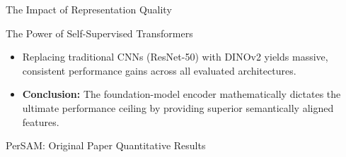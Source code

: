 \documentclass[aspectratio=169, 10pt]{beamer}
\begin{document}
\begin{frame}{The Impact of Representation Quality}
    \begin{table}[htbp]
    \centering
    \caption{Impact of Backbone Choice on COCO-$20^i$ (1-Shot mIoU \%)}
    \end{table}

    \begin{exampleblock}{The Power of Self-Supervised Transformers}
        \begin{itemize}
            \item Replacing traditional CNNs (ResNet-50) with DINOv2 yields massive, consistent performance gains across all evaluated architectures.
            \item \textbf{Conclusion:} The foundation-model encoder mathematically dictates the ultimate performance ceiling by providing superior semantically aligned features.
        \end{itemize}
    \end{exampleblock}
\end{frame}





\begin{frame}{PerSAM: Original Paper Quantitative Results}
    \begin{table}[htbp]
    \centering
    \caption{Personalized \& Video Segmentation Performance \cite{zhang2024persam}}
    \end{table}
    
\end{frame}
\end{document}
